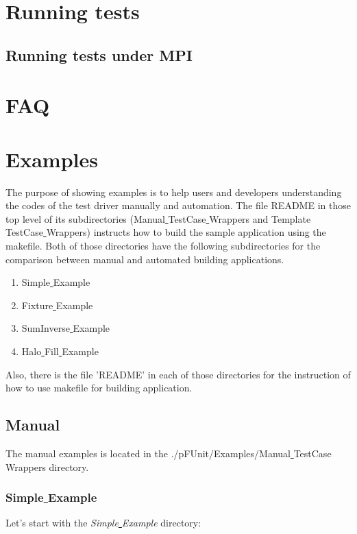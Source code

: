 \documentclass[10pt]{article}
\begin{document}
\section{Running tests}
\subsection{Running tests under MPI}

\section{FAQ}


\section{Examples}
The purpose of showing examples is to help users and developers understanding the codes of the test driver manually and automation.   The file README in those top level of its subdirectories (Manual\underline{ }TestCase\underline{ }Wrappers and Template\underline{ }TestCase\underline{ }Wrappers) instructs how to build the sample application using the makefile.    Both of those directories have the following subdirectories for the comparison between manual and automated building applications.    
\begin{enumerate}
\item Simple\underline{ }Example
\item Fixture\underline{ }Example
\item SumInverse\underline{ }Example
\item Halo\underline{ }Fill\underline{ }Example
\end{enumerate}

Also, there is the file 'README' in each of those directories for the instruction of how to use makefile for building application.


\subsection{Manual}
The manual examples is located in the ./pFUnit/Examples/Manual\underline{ }TestCase\underline{ }Wrappers directory.

\subsubsection{Simple\underline{ }Example}
Let's start with the \emph{Simple\underline{ }Example} directory:
\end{document}

